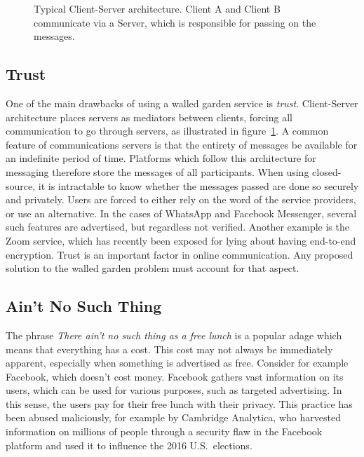 \begin{figure}
	\centering
	\resizebox{!}{!}{}
	\caption{
		Typical Client-Server architecture.
		Client A and Client B communicate via a Server, which is responsible for passing on the messages.
	}\label{fig:client_server}
\end{figure}

\subsection{Trust}\label{sec:Trust}
One of the main drawbacks of using a walled garden service is \textit{trust}.
Client-Server architecture places servers as mediators between clients, forcing all communication to go through servers, as illustrated in figure~\ref{fig:client_server}.
A common feature of communications servers is that the entirety of messages be available for an indefinite period of time.
Platforms which follow this architecture for messaging therefore store the messages of all participants.
When using closed-source, it is intractable to know whether the messages passed are done so securely and privately.
Users are forced to either rely on the word of the service providers, or use an alternative.
In the cases of WhatsApp and Facebook Messenger, several such features are advertised, but regardless not verified\cite{twitter_comms_protocol_comparison}.
Another example is the Zoom service, which has recently been exposed for lying about having end-to-end encryption\cite{zoom_e2ee_or_not}.
Trust is an important factor in online communication.
Any proposed solution to the walled garden problem must account for that aspect.

\subsection{Ain't No Such Thing}
The phrase \textit{There ain't no such thing as a free lunch} is a popular adage which means that everything has a cost.
This cost may not always be immediately apparent, especially when something is advertised as free.
Consider for example Facebook, which doesn't cost money.
Facebook gathers vast information on its users, which can be used for various purposes, such as targeted advertising.
In this sense, the users pay for their free lunch with their privacy.
This practice has been abused maliciously, for example by Cambridge Analytica,
who harvested information on millions of people through a security flaw in the Facebook platform and used it to influence the 2016 U.S.~elections\cite{cadwalladr2018revealed, cadwalladr2018cambridge, isaak2018user, berghel2018malice}.


